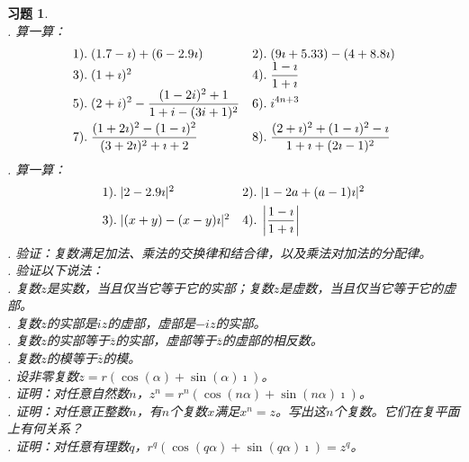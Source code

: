 \documentclass[12pt,UTF8]{ctexbook}
\theoremstyle{definition}
\theoremstyle{plain}
\newtheorem{xt}{习题}[section]
\begin{document}
\begin{xt}
    \mbox{} \\
    . 算一算：\\
    $$
    \begin{array}[]{ll}
        1). \;(1.7 - \imath) + (6 - 2.9\imath)   & 2).\; (9\imath + 5.33) - (4 + 8.8\imath) \\
        3). \;(1+\imath)^2                       & 4). \;\displaystyle \frac{1 - \imath}{1 + \imath} \\
        5). \;\displaystyle (2 + i)^2 - \frac{(1 - 2i)^2 + 1}{1 + i - (3i + 1)^2 }   & 6). \;\displaystyle i^{4n+3} \\[8pt]
        7). \;\displaystyle\frac{(1 + 2\imath)^2 - (1 - \imath)^2}{(3 + 2\imath)^2 + \imath + 2} & 8). \;\displaystyle\frac{(2 + \imath)^2 + (1 - \imath)^2 - \imath}{1 + \imath + (2\imath - 1)^2} \\
    \end{array}
    $$
    . 算一算：\\
    $$
    \begin{array}[]{ll}
        1). \;|2 - 2.9\imath|^2   & 2).\; |1 - 2a + (a - 1)\imath|^2 \\[4pt]
        3). \;|(x + y) - (x - y)\imath|^2   & 4).\;\displaystyle\left|\frac{1 - \imath}{1 + \imath} \right|\\
    \end{array}
    $$
    . 验证：复数满足加法、乘法的交换律和结合律，以及乘法对加法的分配律。\\
    . 验证以下说法：\\
    . 复数$z$是实数，当且仅当它等于它的实部；复数$z$是虚数，当且仅当它等于它的虚部。\\
    . 复数$z$的实部是$iz$的虚部，虚部是$-iz$的实部。\\
    . 复数$z$的实部等于$\overline{z}$的实部，虚部等于$\overline{z}$的虚部的相反数。\\
    . 复数$z$的模等于$\overline{z}$的模。\\
    . 设非零复数$z = r(\cos{(\alpha)} + \sin{(\alpha)}\imath)$。\\
    . 证明：对任意自然数$n$，$z^n = r^n(\cos{(n\alpha)} + \sin{(n\alpha)}\imath)$。 \\
    . 证明：对任意正整数$n$，有$n$个复数$x$满足$x^n = z$。写出这$n$个复数。它们在复平面上有何关系？\\
    . 证明：对任意有理数$q$，$r^q(\cos{(q\alpha)} + \sin{(q\alpha)}\imath) = z^q$。 \\

\end{xt}
\end{document}
